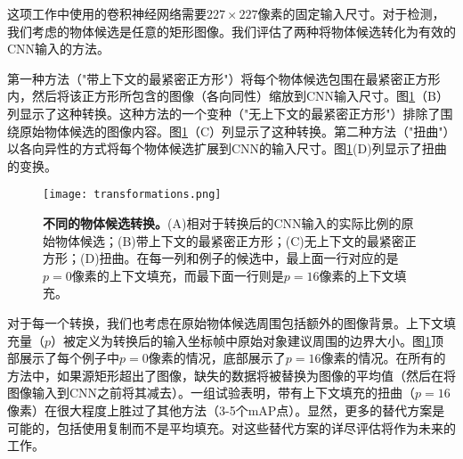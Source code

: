 \documentclass[../main.tex]{subfile}
\begin{document}
这项工作中使用的卷积神经网络需要$227\times 227$像素的固定输入尺寸。对于检测，我们考虑的物体候选是任意的矩形图像。我们评估了两种将物体候选转化为有效的CNN输入的方法。

第一种方法（"带上下文的最紧密正方形"）将每个物体候选包围在最紧密正方形内，然后将该正方形所包含的图像（各向同性）缩放到CNN输入尺寸。图\ref{fig:transformations}（B）列显示了这种转换。这种方法的一个变种（"无上下文的最紧密正方形"）排除了围绕原始物体候选的图像内容。图\ref{fig:transformations}（C）列显示了这种转换。第二种方法（"扭曲"）以各向异性的方式将每个物体候选扩展到CNN的输入尺寸。图\ref{fig:transformations}(D)列显示了扭曲的变换。

\begin{figure}[H]
    \centering
    \texttt{[image: transformations.png]}
    \caption{\textbf{不同的物体候选转换。}(A)相对于转换后的CNN输入的实际比例的原始物体候选；(B)带上下文的最紧密正方形；(C)无上下文的最紧密正方形；(D)扭曲。在每一列和例子的候选中，最上面一行对应的是$p=0$像素的上下文填充，而最下面一行则是$p=16$像素的上下文填充。}
    \label{fig:transformations}
\end{figure}

对于每一个转换，我们也考虑在原始物体候选周围包括额外的图像背景。上下文填充量（$p$）被定义为转换后的输入坐标帧中原始对象建议周围的边界大小。图\ref{fig:transformations}顶部展示了每个例子中$p=0$像素的情况，底部展示了$p=16$像素的情况。在所有的方法中，如果源矩形超出了图像，缺失的数据将被替换为图像的平均值（然后在将图像输入到CNN之前将其减去）。一组试验表明，带有上下文填充的扭曲（$p=16$像素）在很大程度上胜过了其他方法（3-5个mAP点）。显然，更多的替代方案是可能的，包括使用复制而不是平均填充。对这些替代方案的详尽评估将作为未来的工作。
\end{document}
